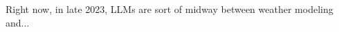 \documentclass{beamer}
\begin{document}
\begin{frame}[plain]
\end{frame}


\begin{frame}
	Right now, in late 2023, LLMs are sort of midway between weather modeling and...
\end{frame}
\end{document}
